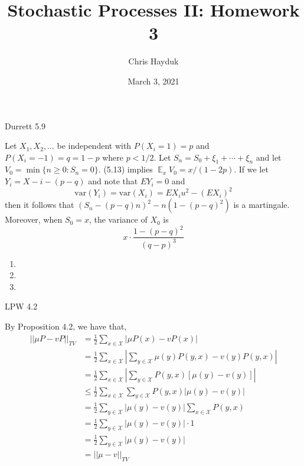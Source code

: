 \documentclass[12pt]{article}
\newenvironment{problem}[2][Problem]{\begin{trivlist}
\item[\hskip \labelsep {\bfseries #1}\hskip \labelsep {\bfseries #2.}]}{\end{trivlist}}
\DeclareMathOperator*{\E}{\mathbb{E}}
\begin{document}
\title{Stochastic Processes II: Homework 3}

\author{Chris Hayduk}
\date{March 3, 2021}

\maketitle

\begin{problem}{I}
\end{problem}


\begin{problem}{II}
Durrett 5.9
\end{problem}

Let $X_1, X_2, \ldots$ be independent with $P(X_i = 1) = p$ and $P(X_i = -1) = q = 1-p$ where $p < 1/2$. Let $S_n = S_0 + \xi_1 + \cdots + \xi_n$ and let $V_0 = \min\{n \geq 0 : S_n = 0\}$. (5.13) implies $\E_xV_0 = x/(1-2p)$. If we let $Y_i = X - i - (p-q)$ and note that $EY_i = 0$ and $$\text{var}(Y_i) = \text{var}(X_i) = EX_iu^2 - (EX_i)^2$$ then it follows that $(S_n - (p-q)n)^2 - n(1-(p-q)^2)$ is a martingale. Moreover, when $S_0 = x$, the variance of $X_0$ is $$x \cdot \frac{1 - (p-q)^2}{(q-p)^3}$$
\begin{enumerate}[label=(\alph*)]

\item

\item

\item

\end{enumerate}


\begin{problem}{III}
LPW 4.2
\end{problem}

By Proposition 4.2, we have that,
\begin{align*}
||\mu P - vP||_{TV} &= \frac{1}{2} \sum_{x \in \mathcal{X}} |\mu P(x) - vP(x)|\\
&= \frac{1}{2} \sum_{x \in \mathcal{X}} \left| \sum_{y \in \mathcal{X}} \mu(y) P(y, x) - v(y)P(y, x) \right|\\
&= \frac{1}{2} \sum_{x \in \mathcal{X}} \left| \sum_{y \in \mathcal{X}} P(y,x)[\mu(y) - v(y)] \right|\\
&\leq \frac{1}{2} \sum_{x \in \mathcal{X}} \sum_{y \in \mathcal{X}} P(y,x)|\mu(y) - v(y)|\\
&= \frac{1}{2} \sum_{y \in \mathcal{X}} |\mu(y) - v(y)| \sum_{x \in \mathcal{X}} P(y,x)\\
&= \frac{1}{2} \sum_{y \in \mathcal{X}} |\mu(y) - v(y)| \cdot 1\\
&= \frac{1}{2} \sum_{y \in \mathcal{X}} |\mu(y) - v(y)|\\
&= ||\mu - v||_{TV}
\end{align*}
\end{document}
